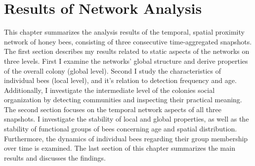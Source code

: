 \chapter{Results of Network Analysis}
\label{ch:results}
This chapter summarizes the analysis results of the temporal, spatial proximity network of honey bees, consisting of three consecutive time-aggregated snapshots.\\
The first section describes my results related to static aspects of the networks on three levels.
First I examine the networks' global structure and derive properties of the overall colony (global level). Second I study the characteristics of individual bees (local level), and it's relation to detection frequency and age.
Additionally, I investigate the intermediate level of the colonies social organization by detecting communities and inspecting their practical meaning.\\
The second section focuses on the temporal network aspects of all three snapshots.
I investigate the stability of local and global properties, as well as the stability of functional groups of bees concerning age and spatial distribution. Furthermore, the dynamics of individual bees regarding their group membership over time is examined.
The last section of this chapter summarizes the main results and discusses the findings.


\newpage

